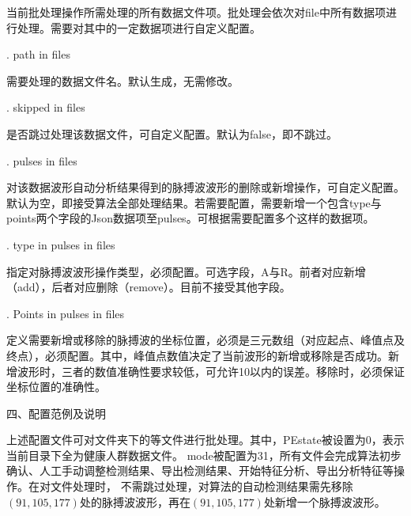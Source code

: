 {当前批处理操作所需处理的所有数据文件项。批处理会依次对file中所有数据项进行处理。需要对其中的一定数据项进行自定义配置。

. path in files

需要处理的数据文件名。默认生成，无需修改。

. skipped in files

是否跳过处理该数据文件，可自定义配置。默认为false，即不跳过。

. pulses in files

对该数据波形自动分析结果得到的脉搏波波形的删除或新增操作，可自定义配置。默认为空，即接受算法全部处理结果。若需要配置，需要新增一个包含type与points两个字段的Json数据项至pulses。可根据需要配置多个这样的数据项。

. type in pulses in files

指定对脉搏波波形操作类型，必须配置。可选字段，A与R。前者对应新增（add），后者对应删除（remove）。目前不接受其他字段。

. Points in pulses in files

定义需要新增或移除的脉搏波的坐标位置，必须是三元数组（对应起点、峰值点及终点），必须配置。其中，峰值点数值决定了当前波形的新增或移除是否成功。新增波形时，三者的数值准确性要求较低，可允许10以内的误差。移除时，必须保证坐标位置的准确性。

四、配置范例及说明



上述配置文件可对文件夹下的等文件进行批处理。其中，PEstate被设置为0，表示当前目录下全为健康人群数据文件。
mode被配置为31，所有文件会完成算法初步确认、人工手动调整检测结果、导出检测结果、开始特征分析、导出分析特征等操作。在对文件处理时，
不需跳过处理，对算法的自动检测结果需先移除$(91,105,177)$处的脉搏波波形，再在$(91,105,177)$处新增一个脉搏波波形。
}